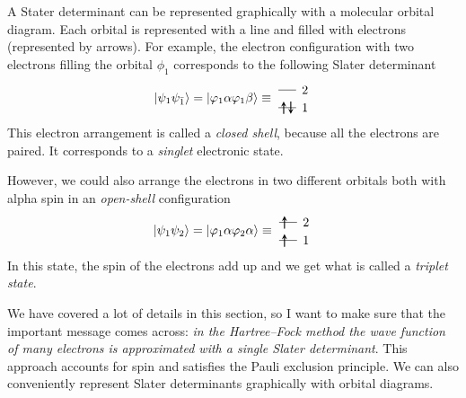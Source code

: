 \documentclass[../Main/chem371-notes.tex]{subfiles}
\begin{document}
A Stater determinant can be represented graphically with a molecular orbital diagram. Each orbital is represented with a line and filled with electrons (represented by arrows).
For example, the electron configuration with two electrons filling the orbital $\phi_1$ corresponds to the following Slater determinant
\begin{equation}
\ket{\psi_1 \psi_{\bar{1}}} = 
\ket{\varphi_1 \alpha \varphi_1 \beta }
\equiv \;
\begin{tikzpicture}[baseline={([yshift=-.5ex]current bounding box.center)},]
    \draw (0,0.5) -- (0.5,0.5);
    \draw[thick,->,>=stealth] (0.15,0.325) -- (0.15,0.675);    
    \draw[thick,<-,>=stealth] (0.35,0.325) -- (0.35,0.675);    
    \draw (0,1.0) -- (0.5,1.0);
    \draw (0.75,0.5) node{1};
    \draw (0.75,1.0) node{2};
\end{tikzpicture}
\end{equation}
This electron arrangement is called a \emph{closed shell}, because all the electrons are paired. It corresponds to a \emph{singlet} electronic state.

However, we could also arrange the electrons in two different orbitals both with alpha spin in an \emph{open-shell} configuration
\begin{equation}
\ket{\psi_1 \psi_2}= 
\ket{\varphi_1 \alpha \varphi_2\alpha}
\equiv \;
\begin{tikzpicture}[baseline={([yshift=-.5ex]current bounding box.center)},]
    \draw (0,0.5) -- (0.5,0.5);
    \draw[thick,->,>=stealth] (0.15,0.325) -- (0.15,0.675);    
    \draw[thick,->,>=stealth] (0.15,0.825) -- (0.15,1.175);        
    \draw (0,1.0) -- (0.5,1.0);
    \draw (0.75,0.5) node{1};
    \draw (0.75,1.0) node{2};
\end{tikzpicture}
\end{equation}
In this state, the spin of the electrons add up and we get what is called a \emph{triplet state}.

We have covered a lot of details in this section, so I want to make sure that the important message comes across: \emph{in the Hartree--Fock method the wave function of many electrons is approximated with a single Slater determinant}.
This approach accounts for spin and satisfies the Pauli exclusion principle.
We can also conveniently represent Slater determinants graphically with orbital diagrams.
\end{document}
